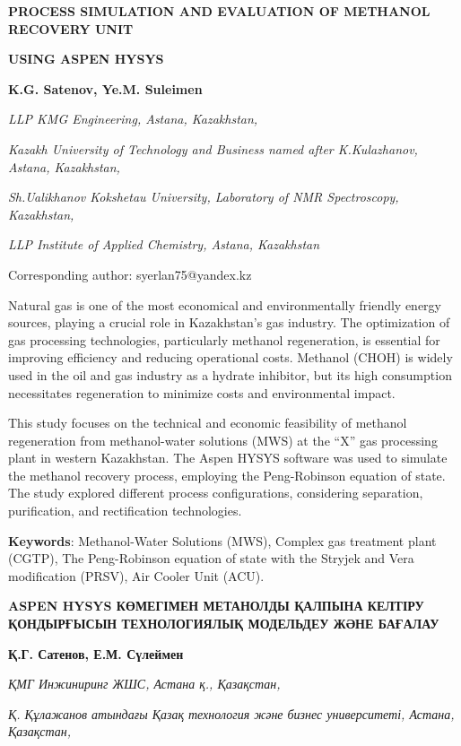 
{\bfseries PROCESS SIMULATION AND EVALUATION OF METHANOL RECOVERY UNIT}

{\bfseries USING ASPEN HYSYS}

{\bfseries {}K.G.
Satenov}{\bfseries ,
Ye.M. Suleimen}
\envelope 

\emph{LLP KMG Engineering, Astana, Kazakhstan,}

\emph{Kazakh University of Technology and Business
named after K.Kulazhanov, Astana, Kazakhstan,}

\emph{Sh.Ualikhanov Kokshetau University, Laboratory
of NMR Spectroscopy, Kazakhstan,}

\emph{LLP Institute of Applied Chemistry, Astana,
Kazakhstan}

\envelope Corresponding author:
syerlan75@yandex.kz

Natural gas is one of the most economical and environmentally friendly
energy sources, playing a crucial role in Kazakhstan's gas industry. The
optimization of gas processing technologies, particularly methanol
regeneration, is essential for improving efficiency and reducing
operational costs. Methanol (CHOH) is widely used in
the oil and gas industry as a hydrate inhibitor, but its high
consumption necessitates regeneration to minimize costs and
environmental impact.

This study focuses on the technical and economic feasibility of methanol
regeneration from methanol-water solutions (MWS) at the ``X'' gas
processing plant in western Kazakhstan. The Aspen HYSYS software was
used to simulate the methanol recovery process, employing the
Peng-Robinson equation of state. The study explored different process
configurations, considering separation, purification, and rectification
technologies.

{\bfseries Keywords}: Methanol-Water Solutions (MWS), Complex gas treatment
plant (CGTP), The Peng-Robinson equation of state with the Stryjek and
Vera modification (PRSV), Air Cooler Unit (ACU).

{\bfseries ASPEN HYSYS КӨМЕГІМЕН МЕТАНОЛДЫ ҚАЛПЫНА КЕЛТІРУ ҚОНДЫРҒЫСЫН
ТЕХНОЛОГИЯЛЫҚ МОДЕЛЬДЕУ ЖӘНЕ БАҒАЛАУ}

{\bfseries {}Қ.Г. Сатенов, Е.М.
Сүлеймен\envelope }

\emph{ҚМГ Инжиниринг ЖШС, Астана қ., Қазақстан,}

\emph{}\emph{Қ. Құлажанов атындағы Қазақ технология
және бизнес университеті, Астана, Қазақстан,}


